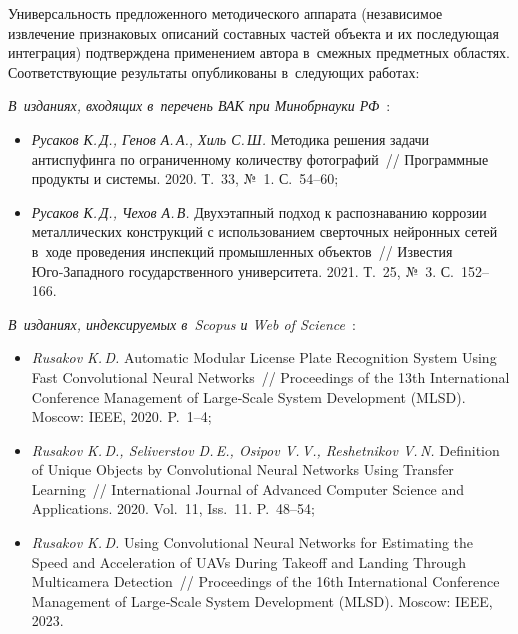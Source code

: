 Универсальность предложенного методического аппарата (независимое
извлечение признаковых описаний составных частей объекта и их
последующая интеграция) подтверждена применением автора в~смежных
предметных областях. Соответствующие результаты опубликованы в~следующих
работах:

\emph{В~изданиях, входящих в~перечень ВАК при Минобрнауки РФ}~\cite{Rusakov2020antispoofing,Rusakov2021corrosion}:
\begin{itemize}
    \item \emph{Русаков К.\,Д., Генов А.\,А., Хиль С.\,Ш.} Методика
    решения задачи антиспуфинга по ограниченному количеству
    фотографий~// Программные продукты и системы. 2020. Т.~33, №~1.
    С.~54--60;

    \item \emph{Русаков К.\,Д., Чехов А.\,В.} Двухэтапный подход к
    распознаванию коррозии металлических конструкций с использованием
    сверточных нейронных сетей в~ходе проведения инспекций промышленных
    объектов~// Известия Юго‑Западного государственного университета.
    2021. Т.~25, №~3. С.~152--166.
\end{itemize}

\emph{В~изданиях, индексируемых в~Scopus и Web of Science}~\cite{Rusakov2020license,Rusakov2020transfer,Rusakov2023uavspeed}:
\begin{itemize}
    \item \emph{Rusakov K.\,D.} Automatic Modular License Plate
    Recognition System Using Fast Convolutional Neural Networks~//
    Proceedings of the 13th International Conference Management of
    Large‑Scale System Development (MLSD). Moscow: IEEE, 2020. P.~1--4;

    \item \emph{Rusakov K.\,D., Seliverstov D.\,E., Osipov V.\,V.,
    Reshetnikov V.\,N.} Definition of Unique Objects by Convolutional
    Neural Networks Using Transfer Learning~// International Journal of
    Advanced Computer Science and Applications. 2020. Vol.~11, Iss.~11.
    P.~48--54;

    \item \emph{Rusakov K.\,D.} Using Convolutional Neural Networks for
    Estimating the Speed and Acceleration of UAVs During Takeoff and
    Landing Through Multicamera Detection~// Proceedings of the 16th
    International Conference Management of Large‑Scale System
    Development (MLSD). Moscow: IEEE, 2023.
\end{itemize}

